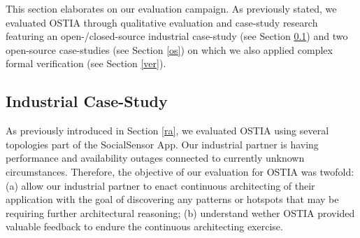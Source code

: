 
This section elaborates on our evaluation campaign. As previously stated, we evaluated OSTIA through qualitative evaluation and case-study research featuring an open-/closed-source industrial case-study (see Section \ref{cs}) and two open-source case-studies (see Section \ref{os}) on which we also applied complex formal verification (see Section \ref{ver}).

\subsection{Industrial Case-Study}\label{cs}

As previously introduced in Section \ref{ra}, we evaluated OSTIA using several
topologies part of the SocialSensor App. Our industrial partner is having
performance and availability outages connected to currently unknown
circumstances. Therefore, the objective of our evaluation for OSTIA was twofold:
(a) allow our industrial partner to enact continuous architecting of their
application with the goal of discovering any patterns or hotspots that may be
requiring further architectural reasoning; (b) understand wether OSTIA provided
valuable feedback to endure the continuous architecting exercise.

